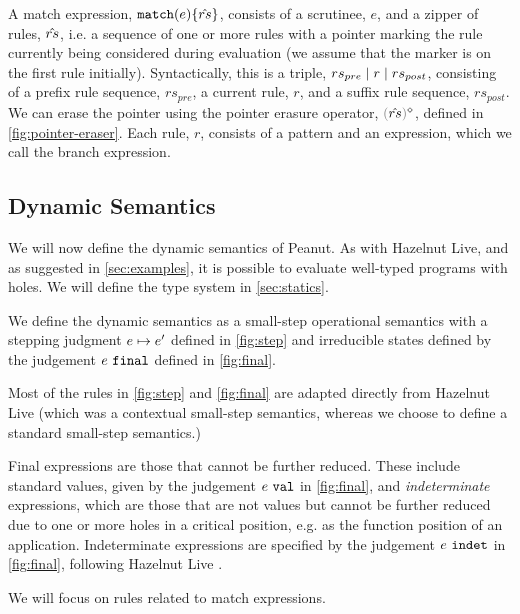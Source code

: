 \documentclass[runningheads,envcountsame,a4paper]{llncs}
\begin{document}
A match expression, $\mathtt{match}(e) \{\hat{rs}\}$, 
consists of a scrutinee, $e$, and a zipper of rules, $\hat{rs}$, i.e. a sequence of one or more rules with a pointer marking the rule currently being considered during evaluation (we assume that the marker is on the first rule initially). Syntactically, this is a triple, $rs_{pre} \mid r \mid rs_{post}$, consisting of a prefix rule sequence, $rs_{pre}$, a current rule, $r$, and a suffix rule sequence, $rs_{post}$. We can erase the pointer using the pointer erasure operator, $\rmpointer{\zrules}$, defined in \autoref{fig:pointer-eraser}. 
Each rule, $r$, consists of a pattern and an expression, which we call the branch expression.



\subsection{Dynamic Semantics}\label{sec:dynamics}
We will now define the dynamic semantics of Peanut. 
As with Hazelnut Live, and as suggested in \autoref{sec:examples}, it is possible to evaluate well-typed programs with holes. We will define the type system in \autoref{sec:statics}.



We define the dynamic semantics as a small-step operational semantics with a stepping judgment
$e \mapsto e'$ defined in \autoref{fig:step} and irreducible states defined by the judgement $e ~\mathtt{final}$ defined in \autoref{fig:final}. 

Most of the rules in \autoref{fig:step} and \autoref{fig:final} are adapted directly from Hazelnut Live \cite{DBLP:journals/pacmpl/OmarVCH19} (which was a contextual small-step semantics, whereas we choose to define a standard small-step semantics.) 

Final expressions are those that cannot be further reduced. These include
standard values, given by the judgement $e ~\mathtt{val}$ in \autoref{fig:final}, 
and \emph{indeterminate} expressions, which are those that are not values but cannot be further reduced due to one or more holes in a critical position, 
e.g. as the function position of an application. Indeterminate expressions
are specified by the judgement $e ~\mathtt{indet}$ in \autoref{fig:final}, following Hazelnut Live \cite{DBLP:journals/pacmpl/OmarVCH19}.

We will focus on rules related to match expressions.
\end{document}
